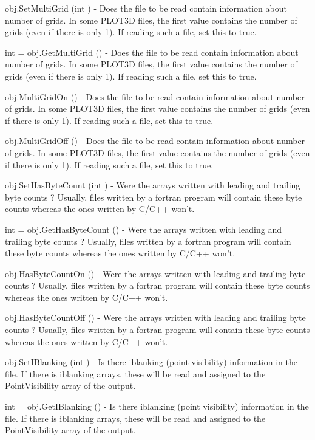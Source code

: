 \begin{DoxyItemize}
\item {\ttfamily obj.\-Set\-Multi\-Grid (int )} -\/ Does the file to be read contain information about number of grids. In some P\-L\-O\-T3\-D files, the first value contains the number of grids (even if there is only 1). If reading such a file, set this to true.  
\item {\ttfamily int = obj.\-Get\-Multi\-Grid ()} -\/ Does the file to be read contain information about number of grids. In some P\-L\-O\-T3\-D files, the first value contains the number of grids (even if there is only 1). If reading such a file, set this to true.  
\item {\ttfamily obj.\-Multi\-Grid\-On ()} -\/ Does the file to be read contain information about number of grids. In some P\-L\-O\-T3\-D files, the first value contains the number of grids (even if there is only 1). If reading such a file, set this to true.  
\item {\ttfamily obj.\-Multi\-Grid\-Off ()} -\/ Does the file to be read contain information about number of grids. In some P\-L\-O\-T3\-D files, the first value contains the number of grids (even if there is only 1). If reading such a file, set this to true.  
\item {\ttfamily obj.\-Set\-Has\-Byte\-Count (int )} -\/ Were the arrays written with leading and trailing byte counts ? Usually, files written by a fortran program will contain these byte counts whereas the ones written by C/\-C++ won't.  
\item {\ttfamily int = obj.\-Get\-Has\-Byte\-Count ()} -\/ Were the arrays written with leading and trailing byte counts ? Usually, files written by a fortran program will contain these byte counts whereas the ones written by C/\-C++ won't.  
\item {\ttfamily obj.\-Has\-Byte\-Count\-On ()} -\/ Were the arrays written with leading and trailing byte counts ? Usually, files written by a fortran program will contain these byte counts whereas the ones written by C/\-C++ won't.  
\item {\ttfamily obj.\-Has\-Byte\-Count\-Off ()} -\/ Were the arrays written with leading and trailing byte counts ? Usually, files written by a fortran program will contain these byte counts whereas the ones written by C/\-C++ won't.  
\item {\ttfamily obj.\-Set\-I\-Blanking (int )} -\/ Is there iblanking (point visibility) information in the file. If there is iblanking arrays, these will be read and assigned to the Point\-Visibility array of the output.  
\item {\ttfamily int = obj.\-Get\-I\-Blanking ()} -\/ Is there iblanking (point visibility) information in the file. If there is iblanking arrays, these will be read and assigned to the Point\-Visibility array of the output.  

\end{DoxyItemize}
